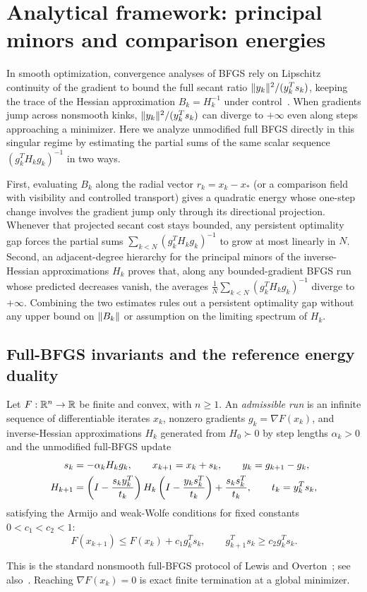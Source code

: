 \section{Analytical framework: principal minors and comparison energies}\label{art:energy}

In smooth optimization, convergence analyses of BFGS rely on Lipschitz
continuity of the gradient to bound the full secant ratio
$\lVert y_k\rVert^2/(y_k^Ts_k)$, keeping the trace of the Hessian approximation
$B_k=H_k^{-1}$ under control~\cite{FND_P76,FND_BN89,FND_N92}. When gradients jump
across nonsmooth kinks, $\lVert y_k\rVert^2/(y_k^Ts_k)$ can diverge to $+\infty$ even
along steps approaching a minimizer. Here we analyze unmodified full BFGS
directly in this singular regime by estimating the partial sums of the same
scalar sequence $(g_k^TH_kg_k)^{-1}$ in two ways.

First, evaluating $B_k$ along the radial vector $r_k=x_k-x_*$ (or a comparison
field with visibility and controlled transport) gives a quadratic energy whose
one-step change involves the gradient jump only through its directional
projection. Whenever that projected secant cost stays bounded, any persistent
optimality gap forces the partial sums $\sum_{k<N}(g_k^TH_kg_k)^{-1}$ to grow
at most linearly in $N$. Second, an adjacent-degree hierarchy for the
principal minors of the inverse-Hessian approximations $H_k$ proves that, along
any bounded-gradient BFGS run whose predicted decreases vanish, the averages
$\frac1N\sum_{k<N}(g_k^TH_kg_k)^{-1}$ diverge to $+\infty$. Combining the two
estimates rules out a persistent optimality gap without any upper bound on
$\lVert B_k\rVert$ or assumption on the limiting spectrum of $H_k$.

\subsection{Full-BFGS invariants and the reference energy duality}

\begin{definition}\label{art:admissible}
Let $F:\mathbb R^n\to\mathbb R$ be finite and convex, with $n\ge1$.
An \emph{admissible run} is an infinite sequence of differentiable iterates
$x_k$, nonzero gradients $g_k=\nabla F(x_k)$, and inverse-Hessian approximations
$H_k$ generated from $H_0\succ0$ by step lengths $\alpha_k>0$ and the
unmodified full-BFGS update
\begin{align}
 s_k&=-\alpha_kH_kg_k,\qquad x_{k+1}=x_k+s_k,
       \qquad y_k=g_{k+1}-g_k,\notag\\
 H_{k+1}&=\left(I-\frac{s_ky_k^T}{t_k}\right)
 H_k\left(I-\frac{y_ks_k^T}{t_k}\right)
       +\frac{s_ks_k^T}{t_k},\qquad t_k=y_k^Ts_k,\label{art:update}
\end{align}
satisfying the Armijo and weak-Wolfe conditions for fixed constants
$0<c_1<c_2<1$:
\begin{equation}\label{art:aw}
 F(x_{k+1})\le F(x_k)+c_1g_k^Ts_k,
 \qquad g_{k+1}^Ts_k\ge c_2g_k^Ts_k.
\end{equation}
\end{definition}
This is the standard nonsmooth full-BFGS protocol of Lewis and
Overton~\cite{LO}; see also~. Reaching $\nabla F(x_k)=0$ is
exact finite termination at a global minimizer.

